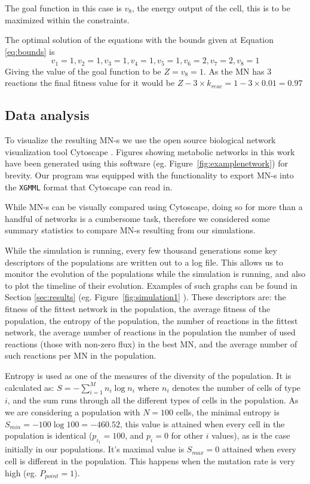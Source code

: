 \documentclass[a4paper,12pt]{article}
\begin{document}
	The goal function in this case is $v_8$, the energy output of the cell, this is to be maximized within the constraints.

	The optimal solution of the equations with the bounds given at Equation \ref{eq:bounds} is 
	\begin{equation}\label{eq:solution}
		v_1=1 , v_2=1, v_3=1, v_4=1, v_5=1, v_6=2, v_7=2, v_8=1
	\end{equation}
	Giving the value of the goal function to be $Z=v_8=1$. As the MN has $3$ reactions the final fitness value for it would be $Z-3\times k_{reac}=1-3\times 0.01=0.97$
\subsection{Data analysis}
\label{sub:visualization}

To visualize the resulting MN-s we use the open source biological network visualization tool Cytoscape \cite{cytoscape}. Figures showing metabolic networks in this work have been generated using this software (eg.  Figure~\ref{fig:examplenetwork}) for brevity. Our program was equipped with the functionality to export MN-s into the \texttt{XGMML} format that Cytoscape can read in. 

While MN-s can be visually compared using Cytoscape, doing so for more than a handful of networks is a cumbersome task, therefore we considered some summary statistics to compare MN-s resulting from our simulations.

While the simulation is running, every few thousand generations some key descriptors of the populations are written out to a log file. This allows us to monitor the evolution of the populations while the simulation is running, and also to plot the timeline of their evolution. Examples of such graphs can be found in Section \ref{sec:results} (eg. Figure~\ref{fig:simulation1} ). These descriptors are: the fitness of the fittest network in the population, the average fitness of the population, the entropy of the population, the number of reactions in the fittest network, the average number of reactions in the population the number of used reactions (those with non-zero flux) in the best MN, and the average number of such reactions per MN in the population. 


Entropy is used as one of the measures of the diversity of the population. It is calculated as: $S=- \sum^{M}_{i=1} n_i \log n_i $ where $n_i$ denotes the number of cells of type $i$, and the sum runs through all the different types of cells in the population.  As we are considering a population with $N=100$ cells, the minimal entropy is $S_{min}=-100\log100=-460.52$, this value is attained when every cell in the population is identical ($p_{i_1}=100$, and $p_i=0$ for other $i$ values), as is the case initially in our populations. It's maximal value is $S_{max}=0$ attained when every cell is different in the population. This happens when the mutation rate is very high (eg. $P_{point}=1$). 
\end{document}
